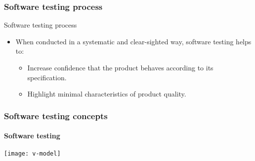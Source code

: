\begin{frame}[parent={cmap:software-testing-foundations}, hasprev=false, hasnext=true]
\frametitle{Software testing process}
\label{concept:software-testing-process}
\label{concept:test-process}

\begin{block:fact}{Software testing process}
\begin{itemize}
	\item When conducted in a systematic and clear-sighted way, software
	testing helps to:
	\begin{itemize}
		\item Increase confidence that the product behaves according to its
		specification.

		\item Highlight minimal characteristics of product quality.
	\end{itemize}
\end{itemize}
\end{block:fact}
\end{frame}


\begin{frame}[hasprev=true, hasnext=false]
\frametitle{Software testing concepts}
\framesubtitle{Software testing}

\begin{block:fact}{}
	\centering
	\texttt{[image: v-model]}
\end{block:fact}
\end{frame}